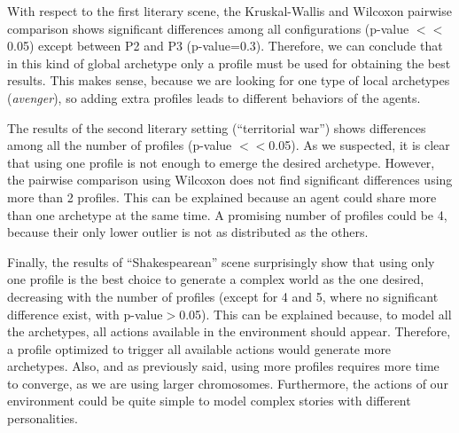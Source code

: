 \documentclass[letterpaper]{article}
\begin{document}
With respect to the first literary scene, the Kruskal-Wallis and Wilcoxon
pairwise comparison shows significant differences among all
configurations (p-value $<<$ 0.05) except between P2 and P3
(p-value=0.3). Therefore, we can conclude that in this kind of global
archetype only a profile must be used for obtaining the best
results. This makes sense, because we are looking for one type of
local archetypes ({\em avenger}), so adding extra profiles leads to
different behaviors of the agents. 



The results of the second literary setting (``territorial war'') shows differences among all the number of profiles (p-value $<<$0.05). As we suspected, it is clear that using one profile is not enough to emerge the desired archetype. However, the pairwise comparison using Wilcoxon does not find significant differences using more than 2 profiles. This can be explained because an agent could share more than one archetype at the same time.  A promising number of profiles could be 4, because their only lower outlier is not as distributed as the others. %

Finally, the results of ``Shakespearean'' scene surprisingly show that using only one profile is the best choice to generate a complex world as the one desired, decreasing with the number of profiles (except for 4 and 5, where no significant difference exist, with p-value$>$0.05). This can be explained because, to model all the archetypes, all actions available in the environment should appear. Therefore, a profile optimized to trigger all available actions would generate more archetypes. Also, and as previously said, using more profiles requires more time to converge, as we are using larger chromosomes. Furthermore, the actions of our environment could be quite simple to model complex stories with different personalities.

\begin{table}
\begin{center}
\end{center}
\vskip 0.25cm
\caption{Results for 30 executions of each configuration using 1 to 5 profiles (average best fitness $\pm$ std. dev).}
\label{tab:results}
\end{table}
\end{document}
